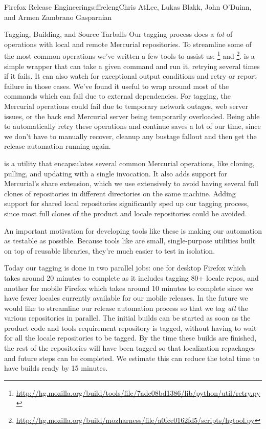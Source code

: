 \begin{aosachapter}{Firefox Release Engineering}{s:ffreleng}{Chris AtLee, Lukas Blakk, John O'Duinn, and Armen Zambrano Gasparnian}
\begin{aosasect1}{Tagging, Building, and Source Tarballs}
Our tagging process does a \emph{lot} of operations with local and
remote Mercurial repositories. To streamline some of the most
common operations we've written a few tools to assist us:
\footnote{\url{http://hg.mozilla.org/build/tools/file/7adc08bd1386/lib/python/util/retry.py}}
and
\footnote{\url{http://hg.mozilla.org/build/mozharness/file/a0fce0162fd5/scripts/hgtool.py}}.
 is a simple wrapper that can take a given command and
run it, retrying several times if it fails. It can also watch for
exceptional output conditions and retry or report failure in those
cases. We've found it useful to wrap  around most of the
commands which can fail due to external dependencies.  For tagging,
the Mercurial operations could fail due to temporary network outages, web
server issues, or the back end Mercurial server being temporarily
overloaded. Being able to automatically retry these operations and
continue saves a lot of our time, since we don't have to manually
recover, cleanup any bustage fallout and then get the release automation running again.
    
 is a utility that encapsulates several common Mercurial
operations, like cloning, pulling, and updating with a single invocation. It
also adds support for Mercurial's share extension, which we use extensively
to avoid having several full clones of repositories in
different directories on the same machine.  Adding support for shared
local repositories significantly sped up our tagging process, since most
full clones of the product and locale repositories could be avoided.
    
An important motivation for developing tools like these is 
making our automation as testable as possible. Because tools like
 are small, single-purpose utilities built on top of
reusable libraries, they're much easier to test in isolation.

Today our tagging is done in two parallel jobs: one for desktop
Firefox which takes around 20 minutes to complete as it includes
tagging 80+ locale repos, and another for mobile Firefox which takes
around 10 minutes to complete since we have fewer locales currently
available for our mobile releases. In the future we would like to
streamline our release automation process so that we tag \emph{all}
the various repositories in parallel. The initial builds can be
started as soon as the product code and tools requirement
repository is tagged, without having to wait for all the locale
repositories to be tagged. By the time these builds are finished, the
rest of the repositories will have been tagged so that localization
repackages and future steps can be completed.  We estimate this can
reduce the total time to have builds ready by 15 minutes.


\end{aosasect1}
\end{aosachapter}
